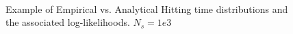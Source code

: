 \documentclass{article}
\begin{document}
\begin{figure}[h]
\begin{center}
{}
\\
\caption[labelInTOC]{Example of Empirical vs. Analytical Hitting time
distributions and the associated log-likelihoods. $N_s = 1e3$}
\label{fig:log_likelihood_beta_examples_1000}
\end{center}
\end{figure} 
\end{document}
